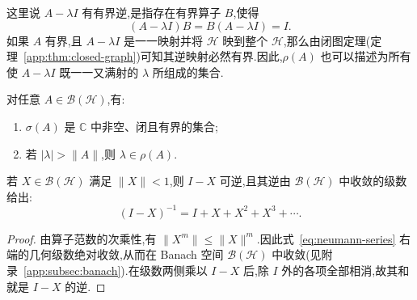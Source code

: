 这里说 \(A-\lambda I\) 有有界逆,是指存在有界算子 \(B\),使得
\[
(A-\lambda I)B=B(A-\lambda I)=I.
\]
如果 \(A\) 有界,且 \(A-\lambda I\) 是一一映射并将 \(\mathcal{H}\) 映到整个 \(\mathcal{H}\),那么由闭图定理(定理~\ref{app:thm:closed-graph})可知其逆映射必然有界.因此,\(\rho(A)\) 也可以描述为所有使 \(A-\lambda I\) 既一一又满射的 \(\lambda\) 所组成的集合.

\begin{proposition}[有界算子的谱]\label{prop:spectrum-basic}
对任意 \(A\in\mathcal{B}(\mathcal{H})\),有:
\begin{enumerate}
\item \(\sigma(A)\) 是 \(\mathbb{C}\) 中非空、闭且有界的集合;
\item 若 \(|\lambda|>\|A\|\),则 \(\lambda\in\rho(A)\).
\end{enumerate}
\end{proposition}

\begin{lemma}[Neumann 级数]\label{lem:neumann-series}
若 \(X\in\mathcal{B}(\mathcal{H})\) 满足 \(\|X\|<1\),则 \(I-X\) 可逆,且其逆由 \(\mathcal{B}(\mathcal{H})\) 中收敛的级数给出:
\[
(I-X)^{-1}=I+X+X^{2}+X^{3}+\cdots.
\label{eq:neumann-series}
\]
\end{lemma}

\begin{proof}
由算子范数的次乘性,有 \(\|X^{m}\|\leq\|X\|^{m}\).因此式~\eqref{eq:neumann-series} 右端的几何级数绝对收敛,从而在 Banach 空间 \(\mathcal{B}(\mathcal{H})\) 中收敛(见附录~\ref{app:subsec:banach}).在级数两侧乘以 \(I-X\) 后,除 \(I\) 外的各项全部相消,故其和就是 \(I-X\) 的逆.
\end{proof}

